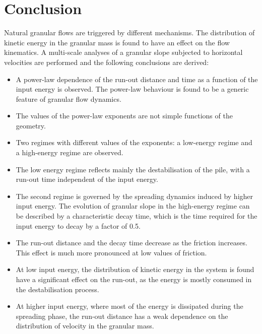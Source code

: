 \documentclass[3p,times,procedia,number]{elsarticle}
\begin{document}
\section{Conclusion}
Natural granular flows are triggered by different mechanisms. The distribution 
of kinetic energy in the granular mass is found to have an effect on the flow 
kinematics. A multi-scale analyses of a granular slope subjected to horizontal 
velocities are performed and the following conclusions are derived:

\begin{itemize}

  \item A power-law dependence of the run-out distance and time as a 
    function of the input energy is observed. The power-law behaviour is found to 
    be a generic feature of granular flow dynamics. 

  \item The values of the power-law exponents are not simple functions of the 
    geometry. 

  \item Two regimes with different values of the exponents: 
    a low-energy regime and a high-energy regime are observed. 

  \item The low energy regime reflects mainly the destabilisation of the pile, 
    with a run-out time independent of the input energy.

  \item The second regime is governed by the spreading dynamics 
    induced by higher input energy. The evolution of granular slope in the 
    high-energy regime can be described by a characteristic decay time, which is 
    the time required for the input energy to decay by a factor of 0.5.

  \item The run-out distance and the decay time decrease as the friction 
    increases. This effect is much more pronounced at low values of friction.

  \item  At low input energy, the distribution of kinetic energy in the system is 
    found have a significant effect on the run-out, as the energy is mostly 
    consumed in the destabilisation process. 
     
  \item At higher input energy, where most of the energy is dissipated during 
    the spreading phase, the run-out distance has a weak dependence on the 
    distribution of velocity in the granular mass. 


\end{itemize}
\end{document}
